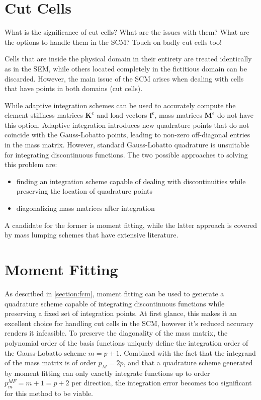 %
\section{Cut Cells}
\label{section:cutcells}
%

What is the significance of cut cells?
What are the issues with them?
What are the options to handle them in the SCM?
Touch on badly cut cells too!

Cells that are inside the physical domain in their entirety are treated identically as in the SEM, while others located completely in the fictitious domain can be discarded. However, the main issue of the SCM arises when dealing with cells that have points in both domains (cut cells).

While adaptive integration schemes can be used to accurately compute the element stiffness matrices $\mathbf K^e$ and load vectors $\mathbf f^e$, mass matrices $\mathbf M^e$ do not have this option. Adaptive integration introduces new quadrature points that do not coincide with the Gauss-Lobatto points, leading to non-zero off-diagonal entries in the mass matrix. However, standard Gauss-Lobatto quadrature is unsuitable for integrating discontinuous functions. The two possible approaches to solving this problem are:

\begin{itemize}
	\item finding an integration scheme capable of dealing with discontinuities while preserving the location of quadrature points
	\item diagonalizing mass matrices after integration
\end{itemize}

A candidate for the former is moment fitting, while the latter approach is covered by mass lumping schemes that have extensive literature.

%
\section{Moment Fitting}
\label{section:moment_fitting}
%

As described in \ref{section:fcm}, moment fitting can be used to generate a quadrature scheme capable of integrating discontinuous functions while preserving a fixed set of integration points. At first glance, this makes it an excellent choice for handling cut cells in the SCM, however it's reduced accuracy renders it infeasible. To preserve the diagonality of the mass matrix, the polynomial order of the basis functions uniquely define the integration order of the Gauss-Lobatto scheme $m=p+1$. Combined with the fact that the integrand of the mass matrix is of order $p_M=2p$, and that a quadrature scheme generated by moment fitting can only exactly integrate functions up to order $p_m^{MF}=m+1=p+2$ per direction, the integration error becomes too significant for this method to be viable.

